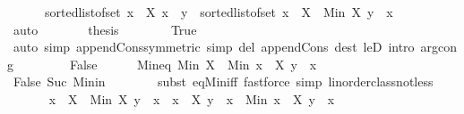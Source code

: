 \begin{isabellebody}
\ \ \ \ \ \ sorted{\isacharunderscore}{\kern0pt}list{\isacharunderscore}{\kern0pt}of{\isacharunderscore}{\kern0pt}set\ {\isacharparenleft}{\kern0pt}{\isacharbraceleft}{\kern0pt}x\ {\isasymin}\ X{\isachardot}{\kern0pt}\ x\ {\isacharless}{\kern0pt}\ y{\isacharbraceright}{\kern0pt}{\isacharparenright}{\kern0pt}\ {\isacharat}{\kern0pt}\ sorted{\isacharunderscore}{\kern0pt}list{\isacharunderscore}{\kern0pt}of{\isacharunderscore}{\kern0pt}set\ {\isacharbraceleft}{\kern0pt}x\ {\isasymin}\ {\isacharparenleft}{\kern0pt}X\ {\isacharminus}{\kern0pt}\ {\isacharbraceleft}{\kern0pt}Min\ X{\isacharbraceright}{\kern0pt}{\isacharparenright}{\kern0pt}{\isachardot}{\kern0pt}\ y\ {\isasymle}\ x{\isacharbraceright}{\kern0pt}{\isachardoublequoteclose}\isanewline
\ \ \ \ \ \ \isamarkupfalse%
\ auto\isanewline
\ \ \ \ \isamarkupfalse%
\ \isamarkupfalse%
\ {\isacharquery}{\kern0pt}thesis\isanewline
\ \ \ \ \ \ \isamarkupfalse%
\ True\isanewline
\ \ \ \ \ \ \isamarkupfalse%
\ {\isacharparenleft}{\kern0pt}auto\ simp{\isacharcolon}{\kern0pt}\ append{\isacharunderscore}{\kern0pt}Cons{\isacharbrackleft}{\kern0pt}symmetric{\isacharbrackright}{\kern0pt}\ simp\ del{\isacharcolon}{\kern0pt}\ append{\isacharunderscore}{\kern0pt}Cons\ dest{\isacharbang}{\kern0pt}{\isacharcolon}{\kern0pt}\ leD\ intro{\isacharcolon}{\kern0pt}\ arg{\isacharunderscore}{\kern0pt}cong{\isacharparenright}{\kern0pt}\isanewline
\ \ \isamarkupfalse%
\isanewline
\ \ \ \ \isamarkupfalse%
\ False\isanewline
\ \ \ \ \isamarkupfalse%
\ Min{\isacharunderscore}{\kern0pt}eq{\isacharcolon}{\kern0pt}\ {\isachardoublequoteopen}Min\ X\ {\isacharequal}{\kern0pt}\ Min\ {\isacharbraceleft}{\kern0pt}x\ {\isasymin}\ X{\isachardot}{\kern0pt}\ y\ {\isasymle}\ x{\isacharbraceright}{\kern0pt}{\isachardoublequoteclose}\isanewline
\ \ \ \ \ \ \isamarkupfalse%
\ False\ Suc\ Min{\isacharunderscore}{\kern0pt}in\isanewline
\ \ \ \ \ \ \isamarkupfalse%
\ {\isacharparenleft}{\kern0pt}subst\ eq{\isacharunderscore}{\kern0pt}Min{\isacharunderscore}{\kern0pt}iff{\isacharparenright}{\kern0pt}\ {\isacharparenleft}{\kern0pt}fastforce\ simp{\isacharcolon}{\kern0pt}\ linorder{\isacharunderscore}{\kern0pt}class{\isachardot}{\kern0pt}not{\isacharunderscore}{\kern0pt}less{\isacharparenright}{\kern0pt}{\isacharplus}{\kern0pt}\isanewline
\ \ \ \ \isamarkupfalse%
\ {}{\isacharcolon}{\kern0pt}\ {\isachardoublequoteopen}{\isacharbraceleft}{\kern0pt}x\ {\isasymin}\ {\isacharparenleft}{\kern0pt}X\ {\isacharminus}{\kern0pt}\ {\isacharbraceleft}{\kern0pt}Min\ X{\isacharbraceright}{\kern0pt}{\isacharparenright}{\kern0pt}{\isachardot}{\kern0pt}\ y\ {\isasymle}\ x{\isacharbraceright}{\kern0pt}\ {\isacharequal}{\kern0pt}\ {\isacharbraceleft}{\kern0pt}x\ {\isasymin}\ X{\isachardot}{\kern0pt}\ y\ {\isasymle}\ x{\isacharbraceright}{\kern0pt}\ {\isacharminus}{\kern0pt}\ {\isacharbraceleft}{\kern0pt}Min\ {\isacharbraceleft}{\kern0pt}x\ {\isasymin}\ X{\isachardot}{\kern0pt}\ y\ {\isasymle}\ x{\isacharbraceright}{\kern0pt}{\isacharbraceright}{\kern0pt}{\isachardoublequoteclose}\isanewline

\end{isabellebody}
